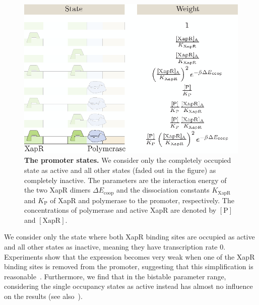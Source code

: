 \documentclass[10pt,letterpaper]{article}
\newcommand{\n}[1]{\mathrm{#1}}
\begin{document}
\begin{figure}%
	\centering
	\includegraphics{media/States.eps}
	\caption{{\bf The promoter states.} We consider only the completely
	occupied state as active and all other states (faded out in the figure)
	as completely inactive. The parameters are the interaction energy of
	the two XapR dimers $\Delta E_{\n{coop}}$ and the dissociation
	constants $K_{\n{XapR}}$ and $K_{\n{P}}$ of XapR and polymerase
	to the promoter, respectively. The concentrations of polymerase
	and active XapR are denoted by $\n{[P]}$ and $\n{[XapR]}$.}
	\label{fig3:states}
\end{figure}

We consider only the state where both XapR binding sites are occupied as
active and all other states as inactive, meaning they have transcription
rate $0$. Experiments show that the expression becomes very weak when one of
the XapR binding sites is removed from the promoter, suggesting that this
simplification is reasonable~\cite{Chure2019}. Furthermore, we find that in
the bistable parameter range, considering the single occupancy states as
active instead has almost no influence on the results (see
also~).
\end{document}
